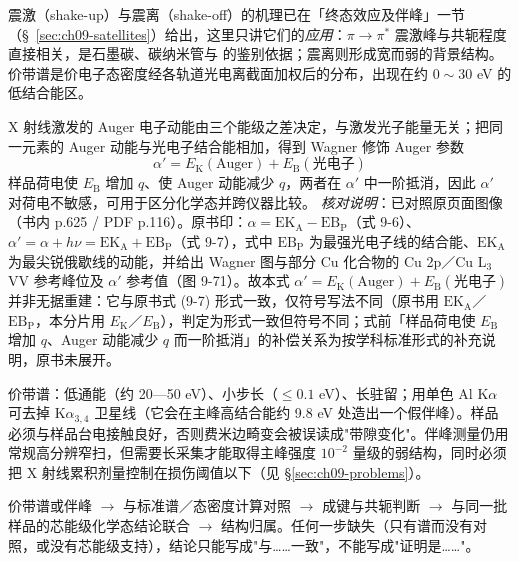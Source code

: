 \begin{principle}
震激（shake-up）与震离（shake-off）的机理已在「终态效应及伴峰」一节（§~\ref{sec:ch09-satellites}）给出，这里只讲它们的\emph{应用}：$\pi\to\pi^{*}$ 震激峰与共轭程度直接相关，是石墨碳、碳纳米管与  的鉴别依据；震离则形成宽而弱的背景结构。价带谱是价电子态密度经各轨道光电离截面加权后的分布，出现在约 $0\sim30$ eV 的低结合能区。

X 射线激发的 Auger 电子动能由三个能级之差决定，与激发光子能量无关；把同一元素的 Auger 动能与光电子结合能相加，得到 Wagner 修饰 Auger 参数
\begin{equation}
\alpha' = E_{\mathrm{K}}(\text{Auger}) + E_{\mathrm{B}}(\text{光电子})
\label{eq:ch09-augerparam}
\end{equation}
样品荷电使 $E_{\mathrm{B}}$ 增加 $q$、使 Auger 动能减少 $q$，两者在 $\alpha'$ 中一阶抵消，因此 $\alpha'$ 对荷电不敏感，可用于区分化学态并跨仪器比较。
\emph{核对说明}：已对照原页面图像（书内 p.625 / PDF p.116）。原书印：$\alpha = \mathrm{EK_A} - \mathrm{EB_P}$（式 9-6）、$\alpha' = \alpha + h\nu = \mathrm{EK_A} + \mathrm{EB_P}$（式 9-7），式中 $\mathrm{EB_P}$ 为最强光电子线的结合能、$\mathrm{EK_A}$ 为最尖锐俄歇线的动能，并给出 Wagner 图与部分 Cu 化合物的 Cu 2p／Cu L$_3$VV 参考峰位及 $\alpha'$ 参考值（图 9-71）。故本式 $\alpha' = E_{\mathrm{K}}(\text{Auger}) + E_{\mathrm{B}}(\text{光电子})$ 并非无据重建：它与原书式 (9-7) 形式一致，仅符号写法不同（原书用 $\mathrm{EK_A}$／$\mathrm{EB_P}$，本分片用 $E_{\mathrm{K}}$／$E_{\mathrm{B}}$），判定为形式一致但符号不同；式前「样品荷电使 $E_{\mathrm{B}}$ 增加 $q$、Auger 动能减少 $q$ 而一阶抵消」的补偿关系为按学科标准形式的补充说明，原书未展开。
\end{principle}

\begin{measure}
价带谱：低通能（约 20—50 eV）、小步长（$\le0.1$ eV）、长驻留；用单色 Al K$\alpha$ 可去掉 K$\alpha_{3,4}$ 卫星线（它会在主峰高结合能约 9.8 eV 处造出一个假伴峰）。样品必须与样品台电接触良好，否则费米边畸变会被误读成"带隙变化"。伴峰测量仍用常规高分辨窄扫，但需要长采集才能取得主峰强度 $10^{-2}$ 量级的弱结构，同时必须把 X 射线累积剂量控制在损伤阈值以下（见 §\ref{sec:ch09-problems}）。
\end{measure}

\begin{dataflow}
价带谱或伴峰 $\to$ 与标准谱／态密度计算对照 $\to$ 成键与共轭判断 $\to$ 与同一批样品的芯能级化学态结论联合 $\to$ 结构归属。任何一步缺失（只有谱而没有对照，或没有芯能级支持），结论只能写成"与……一致"，不能写成"证明是……"。
\end{dataflow}

